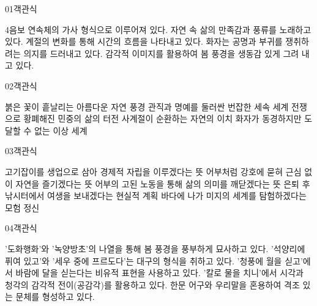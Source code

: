 \documentclass[fs85,seriesWit]{korfarm-base}
\begin{document}
\kfBeginMC
\begin{kfQBlock}{01}{객관식}
\begin{kfChoices}
\kfChoice 4음보 연속체의 가사 형식으로 이루어져 있다.
\kfChoice 자연 속 삶의 만족감과 풍류를 노래하고 있다.
\kfChoice 계절의 변화를 통해 시간의 흐름을 나타내고 있다.
\kfChoice 화자는 공명과 부귀를 쟁취하려는 의지를 드러내고 있다.
\kfChoice 감각적 이미지를 활용하여 봄 풍경을 생동감 있게 그려 내고 있다.
\end{kfChoices}
\end{kfQBlock}

\begin{kfQBlock}{02}{객관식}
\begin{kfChoices}
\kfChoice 붉은 꽃이 흩날리는 아름다운 자연 풍경
\kfChoice 관직과 명예를 둘러싼 번잡한 세속 세계
\kfChoice 전쟁으로 황폐해진 민중의 삶의 터전
\kfChoice 사계절이 순환하는 자연의 이치
\kfChoice 화자가 동경하지만 도달할 수 없는 이상 세계
\end{kfChoices}
\end{kfQBlock}

\begin{kfQBlock}{03}{객관식}
\begin{kfChoices}
\kfChoice 고기잡이를 생업으로 삼아 경제적 자립을 이루겠다는 뜻
\kfChoice 어부처럼 강호에 묻혀 근심 없이 자연을 즐기겠다는 뜻
\kfChoice 어부의 고된 노동을 통해 삶의 의미를 깨닫겠다는 뜻
\kfChoice 은퇴 후 낚시터에서 여생을 보내겠다는 현실적 계획
\kfChoice 바다에 나가 미지의 세계를 탐험하겠다는 모험 정신
\end{kfChoices}
\end{kfQBlock}

\begin{kfQBlock}{04}{객관식}
\begin{kfChoices}
\kfChoice '도화행화'와 '녹양방초'의 나열을 통해 봄 풍경을 풍부하게 묘사하고 있다.
\kfChoice '석양리에 퓌여 있고'와 '세우 중에 프르도다'는 대구의 형식을 취하고 있다.
\kfChoice '청풍에 월을 싣고'에서 바람에 달을 싣는다는 비유적 표현을 사용하고 있다.
\kfChoice '칼로 물을 치니'에서 시각과 청각의 감각적 전이(공감각)를 활용하고 있다.
\kfChoice 한문 어구와 우리말을 혼용하여 격조 있는 문체를 형성하고 있다.
\end{kfChoices}
\end{kfQBlock}
\end{document}
